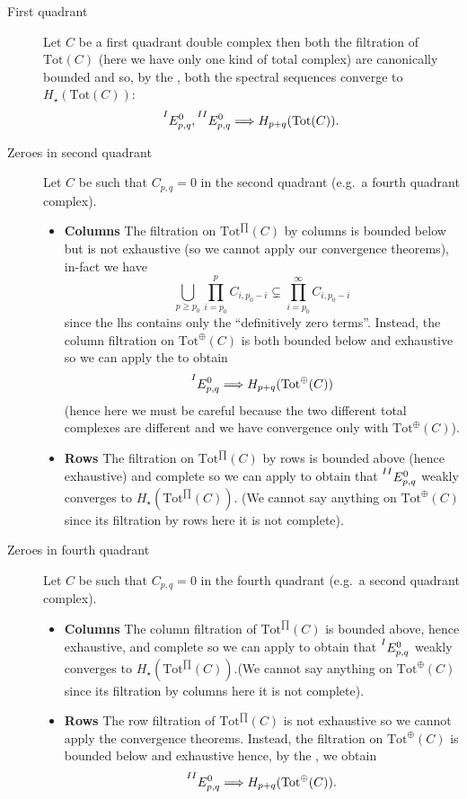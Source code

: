 \documentclass[a4paper]{article}
\newcommand{\Hs}{ H_{\star} }
\newcommand{\tot}{\textrm{Tot}}
\newcommand{\Ii}[1]{\prescript{I}{}{#1}}
\newcommand{\IIi}[1]{\prescript{II}{}{#1}}
\theoremstyle{plain}
\theoremstyle{definition}
\begin{document}
		\begin{description}
			\item[First quadrant] Let $C$ be a first quadrant double complex then both the filtration of $\tot(C)$ (here we have only one kind of total complex) are canonically bounded and so, by the , both the spectral sequences converge to $\Hs(\tot(C))$:
			\[
				\Ii{E^0_{p,q}}, \IIi{E^0_{p,q}} \Longrightarrow H_{p+q}(\tot(C)).
			\]
			\item[Zeroes in second quadrant] Let $C$ be such that $C_{p,q} = 0$ in the second quadrant (e.g.\ a fourth quadrant complex). 
			\begin{itemize} 
				\item \textbf{Columns} The filtration on $\tot^{\prod}(C)$ by columns is bounded below but is not exhaustive (so we cannot apply our convergence theorems), in-fact we have
				\[
					\bigcup_{p \geq p_0} \prod_{i=p_0}^p C_{i, p_0-i} \subsetneq \prod_{i=p_0}^{\infty} C_{i, p_0-i}
				\]
				since the lhs contains only the ``definitively zero terms''. Instead, the column filtration on $\tot^{\oplus}(C)$ is both bounded below and exhaustive so we can apply the  to obtain
				\[
					\Ii{E^0_{p,q}} \Longrightarrow H_{p+q}(\tot^{\oplus}(C))
				\]
				(hence here we must be careful because the two different total complexes are different and we have convergence only with $\tot^{\oplus}(C)$).
				\item \textbf{Rows} The filtration on $\tot^{\prod}(C)$ by rows is bounded above (hence exhaustive) and complete so we can apply  to obtain that $\IIi{E^0_{p,q}}$ weakly converges to $\Hs(\tot^{\prod}(C))$. (We cannot say anything on $\tot^{\oplus}(C)$ since its filtration by rows here it is not complete).
			\end{itemize}
			\item[Zeroes in fourth quadrant] Let $C$ be such that $C_{p,q} = 0$ in the fourth quadrant (e.g.\ a second quadrant complex).
			\begin{itemize}
				\item \textbf{Columns} The column filtration of $\tot^{\prod}(C)$ is bounded above, hence exhaustive, and complete so we can apply  to obtain that $\Ii{E^0_{p,q}}$ weakly converges to $\Hs(\tot^{\prod}(C))$.(We cannot say anything on $\tot^{\oplus}(C)$ since its filtration by columns here it is not complete).
				\item \textbf{Rows} The row filtration of $\tot^{\prod}(C)$ is not exhaustive so we cannot apply the convergence theorems. Instead, the filtration on $\tot^{\oplus}(C)$ is bounded below and exhaustive hence, by the , we obtain
				\[
					\IIi{E^0_{p,q}} \Longrightarrow H_{p+q}(\tot^{\oplus}(C)).
				\]
			\end{itemize}
		\end{description}
\end{document}

